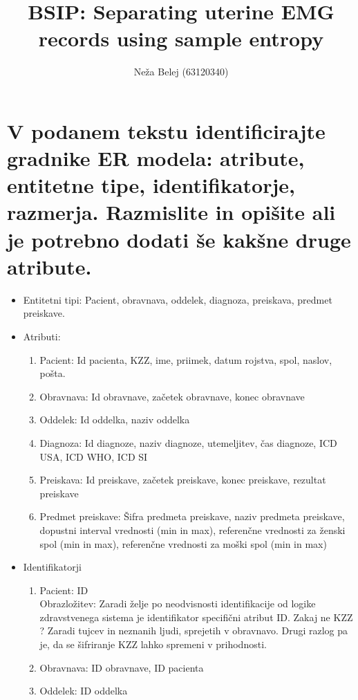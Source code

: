 \documentclass[a4paper,10pt]{article}
\title{BSIP: Separating uterine EMG records using sample entropy }
\author{Neža Belej (63120340)}
\begin{document}
\maketitle
\section {V podanem tekstu identificirajte gradnike ER modela: atribute, entitetne tipe, identifikatorje, razmerja. Razmislite in opišite ali je potrebno dodati še kakšne druge atribute. }
\begin{itemize}
    \item {Entitetni tipi: } Pacient, obravnava, oddelek, diagnoza, preiskava, predmet preiskave.
    \item{Atributi: } 
    \begin{enumerate}
         \item{Pacient: } Id pacienta, KZZ, ime, priimek, datum rojstva, spol, naslov, pošta.
         \item{Obravnava: } Id obravnave, začetek obravnave, konec obravnave
         \item{Oddelek: } Id oddelka, naziv oddelka
         \item{Diagnoza: } Id diagnoze, naziv diagnoze, utemeljitev, čas diagnoze, ICD USA, ICD WHO, ICD SI
         \item{Preiskava: } Id preiskave, začetek preiskave, konec preiskave, rezultat preiskave
         \item{Predmet preiskave: } Šifra predmeta preiskave, naziv predmeta preiskave, dopustni interval vrednosti (min in max), referenčne vrednosti za ženski spol (min in max), referenčne vrednosti za moški spol (min in max)
    \end{enumerate}
     \item{Identifikatorji }
        \begin{enumerate}
             \item{Pacient: } ID  \\
             Obrazložitev: Zaradi želje po neodvisnosti identifikacije od logike zdravstvenega sistema je identifikator specifični atribut ID. Zakaj ne KZZ ? Zaradi tujcev in neznanih ljudi, sprejetih v obravnavo. Drugi razlog pa je, da se šifriranje KZZ lahko spremeni v prihodnosti. \\
             \item{Obravnava: } ID obravnave, ID pacienta \\
             \item{Oddelek: } ID oddelka \\

\end{enumerate}
\end{itemize}
\end{document}
